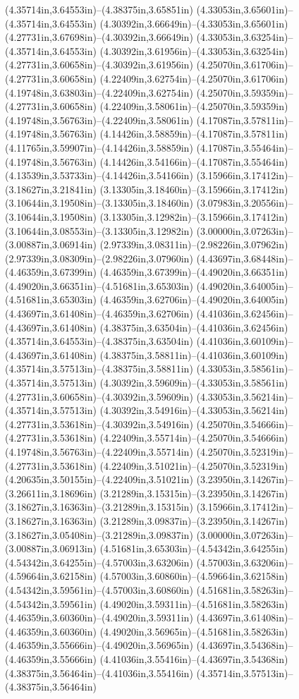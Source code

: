 (4.35714in,3.64553in)--(4.38375in,3.65851in) (4.33053in,3.65601in)--(4.35714in,3.64553in) (4.30392in,3.66649in)--(4.33053in,3.65601in) (4.27731in,3.67698in)--(4.30392in,3.66649in) (4.33053in,3.63254in)--(4.35714in,3.64553in) (4.30392in,3.61956in)--(4.33053in,3.63254in) (4.27731in,3.60658in)--(4.30392in,3.61956in) (4.25070in,3.61706in)--(4.27731in,3.60658in) (4.22409in,3.62754in)--(4.25070in,3.61706in) (4.19748in,3.63803in)--(4.22409in,3.62754in) (4.25070in,3.59359in)--(4.27731in,3.60658in) (4.22409in,3.58061in)--(4.25070in,3.59359in) (4.19748in,3.56763in)--(4.22409in,3.58061in) (4.17087in,3.57811in)--(4.19748in,3.56763in) (4.14426in,3.58859in)--(4.17087in,3.57811in) (4.11765in,3.59907in)--(4.14426in,3.58859in) (4.17087in,3.55464in)--(4.19748in,3.56763in) (4.14426in,3.54166in)--(4.17087in,3.55464in) (4.13539in,3.53733in)--(4.14426in,3.54166in) (3.15966in,3.17412in)--(3.18627in,3.21841in) (3.13305in,3.18460in)--(3.15966in,3.17412in) (3.10644in,3.19508in)--(3.13305in,3.18460in) (3.07983in,3.20556in)--(3.10644in,3.19508in) (3.13305in,3.12982in)--(3.15966in,3.17412in) (3.10644in,3.08553in)--(3.13305in,3.12982in) (3.00000in,3.07263in)--(3.00887in,3.06914in) (2.97339in,3.08311in)--(2.98226in,3.07962in) (2.97339in,3.08309in)--(2.98226in,3.07960in) (4.43697in,3.68448in)--(4.46359in,3.67399in) (4.46359in,3.67399in)--(4.49020in,3.66351in) (4.49020in,3.66351in)--(4.51681in,3.65303in) (4.49020in,3.64005in)--(4.51681in,3.65303in) (4.46359in,3.62706in)--(4.49020in,3.64005in) (4.43697in,3.61408in)--(4.46359in,3.62706in) (4.41036in,3.62456in)--(4.43697in,3.61408in) (4.38375in,3.63504in)--(4.41036in,3.62456in) (4.35714in,3.64553in)--(4.38375in,3.63504in) (4.41036in,3.60109in)--(4.43697in,3.61408in) (4.38375in,3.58811in)--(4.41036in,3.60109in) (4.35714in,3.57513in)--(4.38375in,3.58811in) (4.33053in,3.58561in)--(4.35714in,3.57513in) (4.30392in,3.59609in)--(4.33053in,3.58561in) (4.27731in,3.60658in)--(4.30392in,3.59609in) (4.33053in,3.56214in)--(4.35714in,3.57513in) (4.30392in,3.54916in)--(4.33053in,3.56214in) (4.27731in,3.53618in)--(4.30392in,3.54916in) (4.25070in,3.54666in)--(4.27731in,3.53618in) (4.22409in,3.55714in)--(4.25070in,3.54666in) (4.19748in,3.56763in)--(4.22409in,3.55714in) (4.25070in,3.52319in)--(4.27731in,3.53618in) (4.22409in,3.51021in)--(4.25070in,3.52319in) (4.20635in,3.50155in)--(4.22409in,3.51021in) (3.23950in,3.14267in)--(3.26611in,3.18696in) (3.21289in,3.15315in)--(3.23950in,3.14267in) (3.18627in,3.16363in)--(3.21289in,3.15315in) (3.15966in,3.17412in)--(3.18627in,3.16363in) (3.21289in,3.09837in)--(3.23950in,3.14267in) (3.18627in,3.05408in)--(3.21289in,3.09837in) (3.00000in,3.07263in)--(3.00887in,3.06913in) (4.51681in,3.65303in)--(4.54342in,3.64255in) (4.54342in,3.64255in)--(4.57003in,3.63206in) (4.57003in,3.63206in)--(4.59664in,3.62158in) (4.57003in,3.60860in)--(4.59664in,3.62158in) (4.54342in,3.59561in)--(4.57003in,3.60860in) (4.51681in,3.58263in)--(4.54342in,3.59561in) (4.49020in,3.59311in)--(4.51681in,3.58263in) (4.46359in,3.60360in)--(4.49020in,3.59311in) (4.43697in,3.61408in)--(4.46359in,3.60360in) (4.49020in,3.56965in)--(4.51681in,3.58263in) (4.46359in,3.55666in)--(4.49020in,3.56965in) (4.43697in,3.54368in)--(4.46359in,3.55666in) (4.41036in,3.55416in)--(4.43697in,3.54368in) (4.38375in,3.56464in)--(4.41036in,3.55416in) (4.35714in,3.57513in)--(4.38375in,3.56464in) 